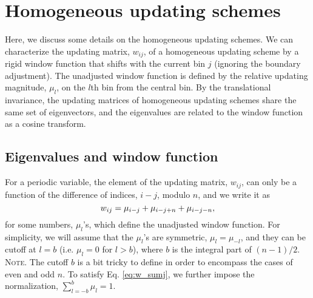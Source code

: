 \documentclass[reprint, superscriptaddress, floatfix]{revtex4-1}
\newcommand{\note}[1]{{\color{DarkGreen}\footnotesize \textsc{Note.} #1}}
\begin{document}
\section{\label{sec:homo}
Homogeneous updating schemes
}


Here, we discuss some details
on the homogeneous updating schemes.
%
We can characterize
the updating matrix, $w_{ij}$,
of a homogeneous updating scheme
by a rigid window function
that shifts with the current bin $j$
(ignoring the boundary adjustment).
%
The unadjusted window function is defined by
the relative updating magnitude, $\mu_l$,
on the $l$th bin from the central bin.
%
%
By the translational invariance,
the updating matrices of homogeneous updating schemes
share the same set of eigenvectors,
and the eigenvalues
are related to the window function as a cosine transform.



\subsection{\label{sec:wband_eig}
Eigenvalues and window function}



For a periodic variable\cite{dama2014},
the element of the updating matrix, $w_{ij}$,
can only be a function of the difference of indices, $i-j$, modulo $n$,
and we write it as
%
\begin{equation}
  w_{ij}
  =
  \mu_{i-j}
  +
  \mu_{i-j+n}
  +
  \mu_{i-j-n}
  ,
  \notag
\end{equation}
%
for some numbers, $\mu_l$'s, which
define the unadjusted window function.
%
For simplicity, we will assume that
the $\mu_l$'s are symmetric, $\mu_l = \mu_{-l}$,
and they can be cutoff at $l = b$
(i.e. $\mu_l = 0$ for $l > b$),
where $b$ is the integral part of $(n-1)/2$.
%
\note{The cutoff $b$ is a bit tricky to define
in order to encompass the cases of even and odd $n$.}%
%
To satisfy Eq. \eqref{eq:w_sumj}, we further impose
the normalization, $\sum_{l=-b}^b \mu_l = 1$.
%
\end{document}
